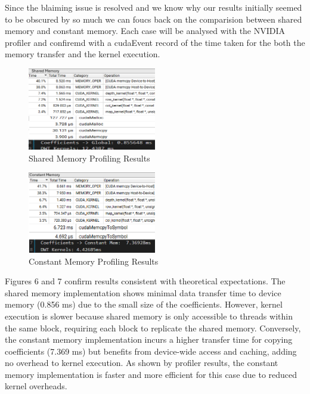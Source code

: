 \documentclass[journal,11pt]{IEEEtran}
\begin{document}
Since the blaiming issue is resolved and we know why our results initially seemed to be obscured by so much we can foucs back on the comparision between shared memory and constant memory. Each case will be analysed with the NVIDIA profiler and confiremd with a cudaEvent record of the time taken for the both the memory transfer and the kernel execution.
\vspace{-1em}
\begin{figure}[h]
    \centering
    \includegraphics[width=0.5\textwidth]{assets/shared-prof.png}
    \caption{Shared Memory Profiling Results}
    \label{fig:6}
\end{figure}
\vspace{-2em}
\begin{figure}[h]
    \centering
    \includegraphics[width=0.5\textwidth]{assets/const-prof.png}
    \caption{Constant Memory Profiling Results}
    \label{fig:7}
\end{figure}

Figures 6 and 7 confirm results consistent with theoretical expectations. The shared memory implementation shows minimal data transfer time to device memory (0.856 ms) due to the small size of the coefficients. However, kernel execution is slower because shared memory is only accessible to threads within the same block, requiring each block to replicate the shared memory. Conversely, the constant memory implementation incurs a higher transfer time for copying coefficients (7.369 ms) but benefits from device-wide access and caching, adding no overhead to kernel execution. As shown by profiler results, the constant memory implementation is faster and more efficient for this case due to reduced kernel overheads.
\end{document}
